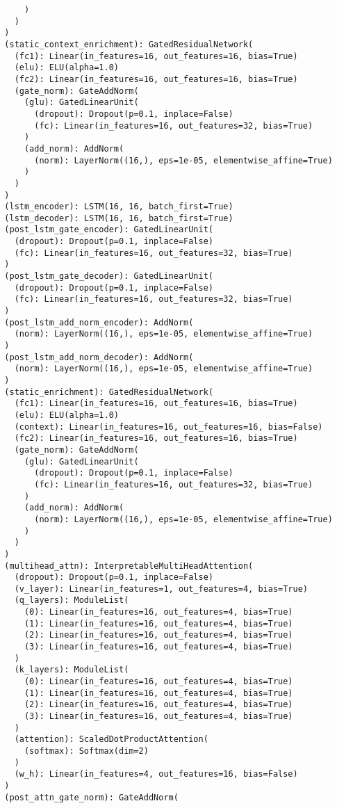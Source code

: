 \documentclass{article}
\begin{document}
\begin{lstlisting}
      )
    )
  )
  (static_context_enrichment): GatedResidualNetwork(
    (fc1): Linear(in_features=16, out_features=16, bias=True)
    (elu): ELU(alpha=1.0)
    (fc2): Linear(in_features=16, out_features=16, bias=True)
    (gate_norm): GateAddNorm(
      (glu): GatedLinearUnit(
        (dropout): Dropout(p=0.1, inplace=False)
        (fc): Linear(in_features=16, out_features=32, bias=True)
      )
      (add_norm): AddNorm(
        (norm): LayerNorm((16,), eps=1e-05, elementwise_affine=True)
      )
    )
  )
  (lstm_encoder): LSTM(16, 16, batch_first=True)
  (lstm_decoder): LSTM(16, 16, batch_first=True)
  (post_lstm_gate_encoder): GatedLinearUnit(
    (dropout): Dropout(p=0.1, inplace=False)
    (fc): Linear(in_features=16, out_features=32, bias=True)
  )
  (post_lstm_gate_decoder): GatedLinearUnit(
    (dropout): Dropout(p=0.1, inplace=False)
    (fc): Linear(in_features=16, out_features=32, bias=True)
  )
  (post_lstm_add_norm_encoder): AddNorm(
    (norm): LayerNorm((16,), eps=1e-05, elementwise_affine=True)
  )
  (post_lstm_add_norm_decoder): AddNorm(
    (norm): LayerNorm((16,), eps=1e-05, elementwise_affine=True)
  )
  (static_enrichment): GatedResidualNetwork(
    (fc1): Linear(in_features=16, out_features=16, bias=True)
    (elu): ELU(alpha=1.0)
    (context): Linear(in_features=16, out_features=16, bias=False)
    (fc2): Linear(in_features=16, out_features=16, bias=True)
    (gate_norm): GateAddNorm(
      (glu): GatedLinearUnit(
        (dropout): Dropout(p=0.1, inplace=False)
        (fc): Linear(in_features=16, out_features=32, bias=True)
      )
      (add_norm): AddNorm(
        (norm): LayerNorm((16,), eps=1e-05, elementwise_affine=True)
      )
    )
  )
  (multihead_attn): InterpretableMultiHeadAttention(
    (dropout): Dropout(p=0.1, inplace=False)
    (v_layer): Linear(in_features=1, out_features=4, bias=True)
    (q_layers): ModuleList(
      (0): Linear(in_features=16, out_features=4, bias=True)
      (1): Linear(in_features=16, out_features=4, bias=True)
      (2): Linear(in_features=16, out_features=4, bias=True)
      (3): Linear(in_features=16, out_features=4, bias=True)
    )
    (k_layers): ModuleList(
      (0): Linear(in_features=16, out_features=4, bias=True)
      (1): Linear(in_features=16, out_features=4, bias=True)
      (2): Linear(in_features=16, out_features=4, bias=True)
      (3): Linear(in_features=16, out_features=4, bias=True)
    )
    (attention): ScaledDotProductAttention(
      (softmax): Softmax(dim=2)
    )
    (w_h): Linear(in_features=4, out_features=16, bias=False)
  )
  (post_attn_gate_norm): GateAddNorm(

\end{lstlisting}
\end{document}
